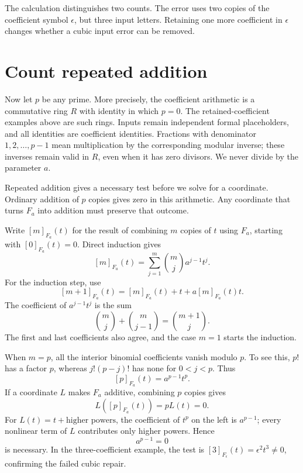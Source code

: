 \documentclass[11pt,letterpaper]{article}
\numberwithin{equation}{section}
\theoremstyle{definition}\newtheorem{example}[theorem]{Example}
\begin{document}
The calculation distinguishes two counts. The error uses two copies of the coefficient symbol \(\epsilon\), but three input letters. Retaining one more coefficient in \(\epsilon\) changes whether a cubic input error can be removed.

\section{Count repeated addition}\label{sec:repeated}

Now let \(p\) be any prime. More precisely, the coefficient arithmetic is a commutative ring \(R\) with identity in which \(p=0\). The retained-coefficient examples above are such rings. Inputs remain independent formal placeholders, and all identities are coefficient identities. Fractions with denominator \(1,2,\ldots,p-1\) mean multiplication by the corresponding modular inverse; these inverses remain valid in \(R\), even when it has zero divisors. We never divide by the parameter \(a\).

Repeated addition gives a necessary test before we solve for a coordinate. Ordinary addition of \(p\) copies gives zero in this arithmetic. Any coordinate that turns \(F_a\) into addition must preserve that outcome.

Write \([m]_{F_a}(t)\) for the result of combining \(m\) copies of \(t\) using \(F_a\), starting with \([0]_{F_a}(t)=0\). Direct induction gives
\begin{equation}\label{eq:m-series}
 [m]_{F_a}(t)=\sum_{j=1}^{m}\binom mj a^{j-1}t^j.
\end{equation}
For the induction step, use
\[
 [m+1]_{F_a}(t)=[m]_{F_a}(t)+t+a[m]_{F_a}(t)t.
\]
The coefficient of \(a^{j-1}t^j\) is the sum
\[
 \binom mj+\binom m{j-1}=\binom{m+1}j.
\]
The first and last coefficients also agree, and the case \(m=1\) starts the induction.

When \(m=p\), all the interior binomial coefficients vanish modulo \(p\). To see this, \(p!\) has a factor \(p\), whereas \(j!(p-j)!\) has none for \(0<j<p\). Thus
\begin{equation}\label{eq:p-series}
 \boxed{\;[p]_{F_a}(t)=a^{p-1}t^p.\;}
\end{equation}
If a coordinate \(L\) makes \(F_a\) additive, combining \(p\) copies gives
\[
 L([p]_{F_a}(t))=pL(t)=0.
\]
For \(L(t)=t+\text{higher powers}\), the coefficient of \(t^p\) on the left is \(a^{p-1}\); every nonlinear term of \(L\) contributes only higher powers. Hence
\begin{equation}\label{eq:necessary}
 a^{p-1}=0
\end{equation}
is necessary. In the three-coefficient example, the test is \([3]_{F_\epsilon}(t)=\epsilon^2t^3\ne0\), confirming the failed cubic repair.
\end{document}
